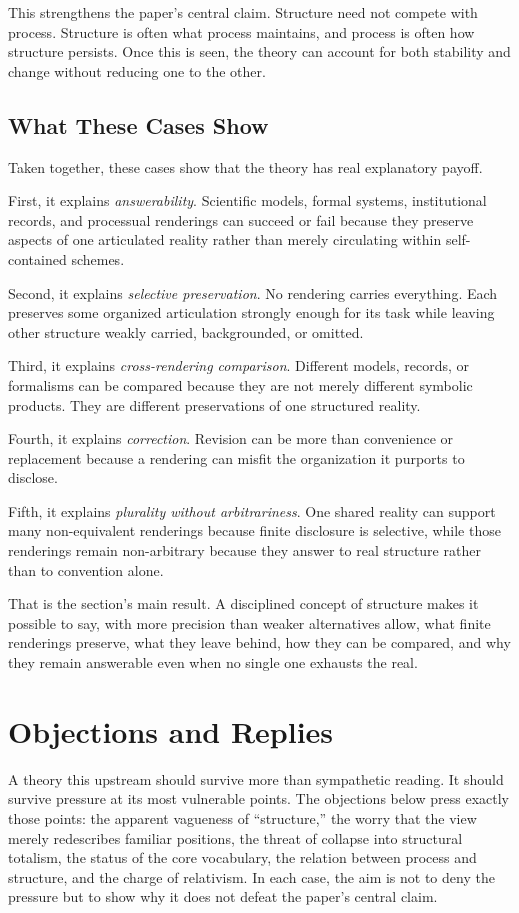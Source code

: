\documentclass[11pt]{article}
\renewcommand{\emph}[1]{\textit{#1}}
\begin{document}
This strengthens the paper's central claim. Structure need not compete with process. Structure is often what process maintains, and process is often how structure persists. Once this is seen, the theory can account for both stability and change without reducing one to the other.

\subsection{What These Cases Show}

Taken together, these cases show that the theory has real explanatory payoff.

First, it explains \emph{answerability}. Scientific models, formal systems, institutional records, and processual renderings can succeed or fail because they preserve aspects of one articulated reality rather than merely circulating within self-contained schemes.

Second, it explains \emph{selective preservation}. No rendering carries everything. Each preserves some organized articulation strongly enough for its task while leaving other structure weakly carried, backgrounded, or omitted.

Third, it explains \emph{cross-rendering comparison}. Different models, records, or formalisms can be compared because they are not merely different symbolic products. They are different preservations of one structured reality.

Fourth, it explains \emph{correction}. Revision can be more than convenience or replacement because a rendering can misfit the organization it purports to disclose.

Fifth, it explains \emph{plurality without arbitrariness}. One shared reality can support many non-equivalent renderings because finite disclosure is selective, while those renderings remain non-arbitrary because they answer to real structure rather than to convention alone.

That is the section's main result. A disciplined concept of structure makes it possible to say, with more precision than weaker alternatives allow, what finite renderings preserve, what they leave behind, how they can be compared, and why they remain answerable even when no single one exhausts the real.
\section{Objections and Replies}

A theory this upstream should survive more than sympathetic reading. It should survive pressure at its most vulnerable points. The objections below press exactly those points: the apparent vagueness of ``structure,'' the worry that the view merely redescribes familiar positions, the threat of collapse into structural totalism, the status of the core vocabulary, the relation between process and structure, and the charge of relativism. In each case, the aim is not to deny the pressure but to show why it does not defeat the paper's central claim.
\end{document}
